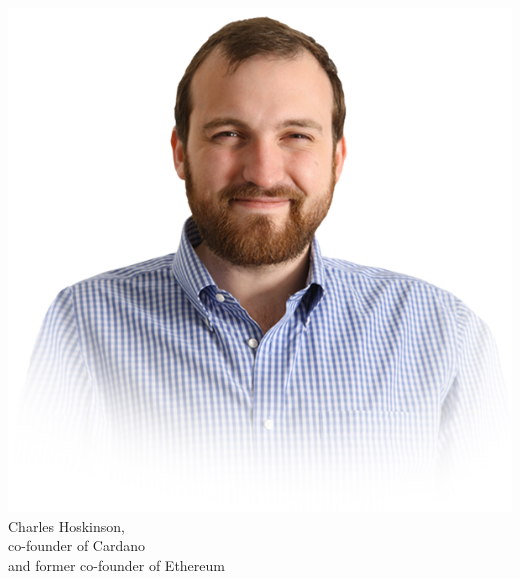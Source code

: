 \documentclass[notitlepage, usenames,dvipsnames]{beamer}
\begin{document}
\begin{frame}
\begin{overlayarea}{\textwidth}{0.75\textheight}
{\begin{columns}
                \centering
                \includegraphics[scale=0.15]{../img/hoskinson.png}\\
                {\scriptsize Charles Hoskinson,\\ co-founder of Cardano\\[-1ex] and former co-founder of Ethereum}

            \end{columns}
        }
    \end{overlayarea}
    \end{frame}
\end{document}
